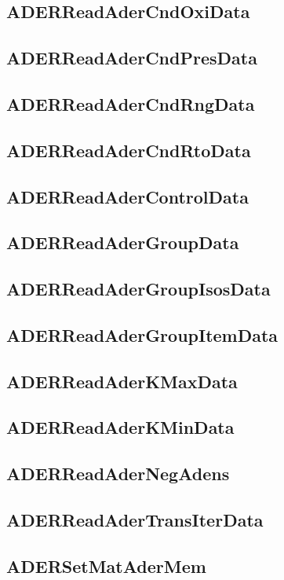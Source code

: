 \subsection{ADERReadAderCndOxiData}


\subsection{ADERReadAderCndPresData}


\subsection{ADERReadAderCndRngData}


\subsection{ADERReadAderCndRtoData}


\subsection{ADERReadAderControlData}


\subsection{ADERReadAderGroupData}


\subsection{ADERReadAderGroupIsosData}


\subsection{ADERReadAderGroupItemData}


\subsection{ADERReadAderKMaxData}


\subsection{ADERReadAderKMinData}


\subsection{ADERReadAderNegAdens}


\subsection{ADERReadAderTransIterData}


\subsection{ADERSetMatAderMem}

